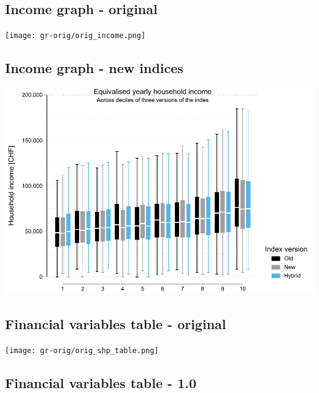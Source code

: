 \documentclass[a4paper, notitlepage, fleqn]{article} %
\begin{document}
\subsection{Income graph - original}

\begin{center}
\texttt{[image: gr-orig/orig\_income.png]} 
\end{center}

\subsection{Income graph - new indices}
\begin{center}
\includegraphics[width=.75\textwidth]{gr/shp_income.pdf} 
\end{center}

\newpage
\subsection{Financial variables table - original}

\begin{center}
\texttt{[image: gr-orig/orig\_shp\_table.png]} 
\end{center}

\newpage
\subsection{Financial variables table - 1.0}
\begin{stlog}\end{stlog}
\newpage
\begin{stlog}\end{stlog}
\newpage
\begin{stlog}\end{stlog}
\newpage
\end{document}

